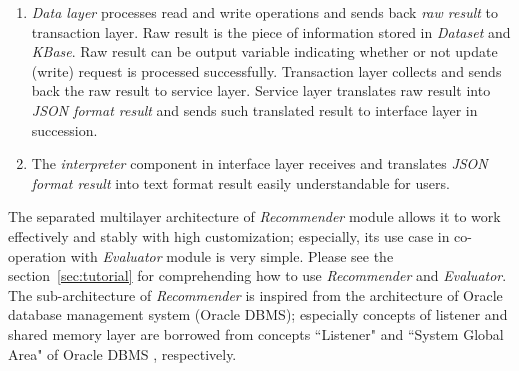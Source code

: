 \documentclass[a4paper,twoside]{article}
\begin{document}
\begin{enumerate}
\item \textit{Data layer} processes read and write operations and sends back \textit{raw result} to transaction layer. Raw result is the piece of information stored in \textit{Dataset} and \textit{KBase}. Raw result can be output variable indicating whether or not update (write) request is processed successfully. Transaction layer collects and sends back the raw result to service layer. Service layer translates raw result into \textit{JSON format result} and sends such translated result to interface layer in succession.
\item The \textit{interpreter} component in interface layer receives and translates \textit{JSON format result} into text format result easily understandable for users.
\end{enumerate}
The separated multilayer architecture of \textit{Recommender} module allows it to work effectively and stably with high customization; especially, its use case in co-operation with \textit{Evaluator} module is very simple. Please see the section~\ref{sec:tutorial} for comprehending how to use \textit{Recommender} and \textit{Evaluator}. The sub-architecture of \textit{Recommender} is inspired from the architecture of Oracle database management system (Oracle DBMS); especially concepts of listener and shared memory layer are borrowed from concepts ``Listener" and ``System Global Area" of Oracle DBMS \cite{oracle2017dbms}, respectively.
\end{document}

